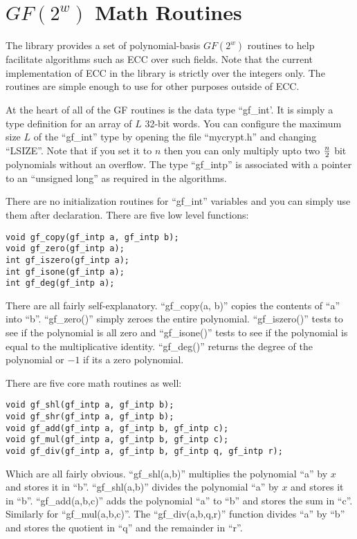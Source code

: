 \documentclass[b5paper]{book}
\begin{document}
\chapter{$GF(2^w)$ Math Routines}

The library provides a set of polynomial-basis $GF(2^w)$ routines to help facilitate algorithms such as ECC over such
fields.  Note that the current implementation of ECC in the library is strictly over the integers only.  The routines
are simple enough to use for other purposes outside of ECC.  

At the heart of all of the GF routines is the data type ``gf\_int'.  It is simply a type definition for an array of 
$L$ 32-bit words.  You can configure the maximum size $L$ of the ``gf\_int'' type by opening the file ``mycrypt.h'' and 
changing ``LSIZE''.  Note that if you set it to $n$ then you can only multiply upto two $n \over 2$ bit polynomials without
an overflow.  The type ``gf\_intp'' is associated with a pointer to an ``unsigned long'' as required in the algorithms.

There are no initialization routines for ``gf\_int'' variables and you can simply use them after declaration.  There are five
low level functions:
    
\begin{verbatim}
void gf_copy(gf_intp a, gf_intp b);
void gf_zero(gf_intp a);
int gf_iszero(gf_intp a);
int gf_isone(gf_intp a);
int gf_deg(gf_intp a);
\end{verbatim}
There are all fairly self-explanatory.  ``gf\_copy(a, b)'' copies the contents of ``a'' into ``b''.  ``gf\_zero()'' simply
zeroes the entire polynomial.  ``gf\_iszero()'' tests to see if the polynomial is all zero and ``gf\_isone()'' tests to see
if the polynomial is equal to the multiplicative identity.  ``gf\_deg()'' returns the degree of the polynomial or $-1$ if its
a zero polynomial.

There are five core math routines as well:
     
\begin{verbatim}
void gf_shl(gf_intp a, gf_intp b);
void gf_shr(gf_intp a, gf_intp b);
void gf_add(gf_intp a, gf_intp b, gf_intp c);
void gf_mul(gf_intp a, gf_intp b, gf_intp c);
void gf_div(gf_intp a, gf_intp b, gf_intp q, gf_intp r);
\end{verbatim}

Which are all fairly obvious.  ``gf\_shl(a,b)'' multiplies the polynomial ``a'' by $x$ and stores it in ``b''.  
``gf\_shl(a,b)'' divides the polynomial ``a'' by $x$ and stores it in ``b''.  ``gf\_add(a,b,c)'' adds the polynomial
``a'' to ``b'' and stores the sum in ``c''.  Similarly for ``gf\_mul(a,b,c)''.  The ``gf\_div(a,b,q,r)'' function divides
``a'' by ``b'' and stores the quotient in ``q'' and the remainder in ``r''.
\end{document}

